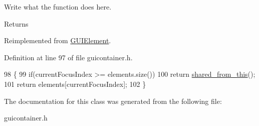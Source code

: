 Write what the function does here. 

\begin{DoxyReturn}{Returns}

\end{DoxyReturn}


Reimplemented from \hyperlink{classGUIElement_acdb491fec728f3a39318850fa144c766}{G\+U\+I\+Element}.



Definition at line 97 of file guicontainer.\+h.


\begin{DoxyCode}
98         \{
99             \textcolor{keywordflow}{if}(currentFocusIndex >= elements.size())
100                 \textcolor{keywordflow}{return} \hyperlink{classGUIElement_a5ad5998c5b953b6c6e32b583ddf9cd97}{shared\_from\_this}();
101             \textcolor{keywordflow}{return} elements[currentFocusIndex];
102         \}
\end{DoxyCode}


The documentation for this class was generated from the following file\+:\begin{DoxyCompactItemize}
\item 
guicontainer.\+h\end{DoxyCompactItemize}
